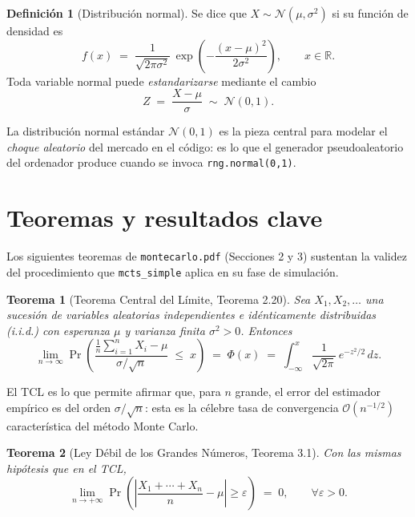 \documentclass[11pt,a4paper]{article}
\newtheorem{theorem}{Teorema}
\theoremstyle{definition}
\newtheorem{definition}{Definición}
\begin{document}
\begin{definition}[Distribución normal]
Se dice que $X\sim\mathcal{N}(\mu,\sigma^2)$ si su función de densidad es
\begin{equation}
f(x) \;=\; \frac{1}{\sqrt{2\pi\sigma^2}}\,\exp\!\left(-\frac{(x-\mu)^2}{2\sigma^2}\right),
\qquad x\in\mathbb{R}.
\label{eq:normal}
\end{equation}
Toda variable normal puede \emph{estandarizarse} mediante el cambio
\begin{equation}
Z \;=\; \frac{X-\mu}{\sigma} \;\sim\; \mathcal{N}(0,1).
\label{eq:estandarizacion}
\end{equation}
\end{definition}

La distribución normal estándar $\mathcal{N}(0,1)$ es la pieza central para modelar el \emph{choque aleatorio} del mercado en el código: es lo que el generador pseudoaleatorio del ordenador produce cuando se invoca \texttt{rng.normal(0,1)}.

\section{Teoremas y resultados clave}

Los siguientes teoremas de \texttt{montecarlo.pdf} (Secciones 2 y 3) sustentan la validez del procedimiento que \texttt{mcts\_simple} aplica en su fase de simulación.

\begin{theorem}[Teorema Central del Límite, Teorema 2.20]
Sea $X_1,X_2,\dots$ una sucesión de variables aleatorias independientes e idénticamente distribuidas (i.i.d.) con esperanza $\mu$ y varianza finita $\sigma^2>0$. Entonces
\begin{equation}
\lim_{n\to\infty}\Pr\!\left(
\frac{\tfrac{1}{n}\sum_{i=1}^{n} X_i - \mu}{\sigma/\sqrt{n}}\;\le\; x
\right)
\;=\;
\Phi(x)
\;=\;
\int_{-\infty}^{x}\frac{1}{\sqrt{2\pi}}\,e^{-z^{2}/2}\,dz.
\label{eq:tcl}
\end{equation}
\end{theorem}

El TCL es lo que permite afirmar que, para $n$ grande, el error del estimador empírico
es del orden $\sigma/\sqrt{n}$: esta es la célebre tasa de convergencia $\mathcal{O}(n^{-1/2})$ característica del método Monte Carlo.

\begin{theorem}[Ley Débil de los Grandes Números, Teorema 3.1]
Con las mismas hipótesis que en el TCL,
\begin{equation}
\lim_{n\to+\infty}\Pr\!\left(\left|\frac{X_1+\cdots+X_n}{n}-\mu\right|\ge\varepsilon\right) \;=\; 0,
\qquad \forall\varepsilon>0.
\label{eq:lgn_debil}
\end{equation}
\end{theorem}
\end{document}
